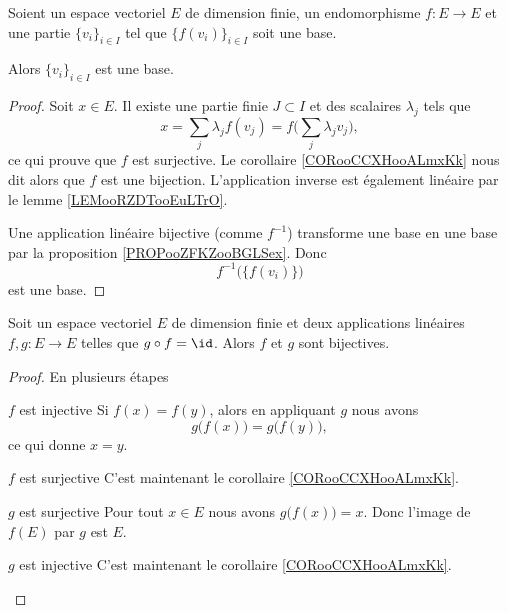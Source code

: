\begin{proposition}     \label{PROPooHLUYooNsDgbn}
    Soient un espace vectoriel \( E\) de dimension finie, un endomorphisme \( f\colon E\to E\) et une partie \( \{v_i\}_{i\in I}\) tel que \( \{f(v_i)\}_{i\in I}\) soit une base.

    Alors \( \{v_i\}_{i\in I}\) est une base.
\end{proposition}

\begin{proof}
    Soit \( x\in E\). Il existe une partie finie \( J\subset I\) et des scalaires \( \lambda_j\) tels que 
    \begin{equation}
        x=\sum_j\lambda_jf(v_j)=f\big( \sum_j\lambda_jv_j \big),
    \end{equation}
    ce qui prouve que \( f\) est surjective. Le corollaire \ref{CORooCCXHooALmxKk} nous dit alors que \( f\) est une bijection. L'application inverse est également linéaire par le lemme \ref{LEMooRZDTooEuLTrO}.

    Une application linéaire bijective (comme \( f^{-1}\)) transforme une base en une base par la proposition \ref{PROPooZFKZooBGLSex}. Donc 
    \begin{equation}
        f^{-1}\big( \{f(v_i)\} \big)
    \end{equation}
    est une base.
\end{proof}

\begin{proposition}     \label{PROPooADESooATJSrH}
    Soit un espace vectoriel \( E\) de dimension finie et deux applications linéaires \( f,g\colon E\to E\) telles que \( g\circ f=\id\). Alors \( f\) et \( g\) sont bijectives.
\end{proposition}

\begin{proof}
    En plusieurs étapes
    \begin{subproof}
        \item[\( f\) est injective]
            Si \( f(x)=f(y)\), alors en appliquant \( g\) nous avons 
            \begin{equation}
                g\big( f(x) \big)=g\big( f(y) \big),
            \end{equation}
            ce qui donne \( x=y\).
        \item[\( f\) est surjective]
            C'est maintenant le corollaire \ref{CORooCCXHooALmxKk}.
        \item[\( g\) est surjective]
            Pour tout \( x\in E\) nous avons \( g\big( f(x) \big)=x\). Donc l'image de \( f(E)\) par \( g\) est $E$. 
        \item[\( g\) est injective]
            C'est maintenant le corollaire \ref{CORooCCXHooALmxKk}.
    \end{subproof}
\end{proof}

